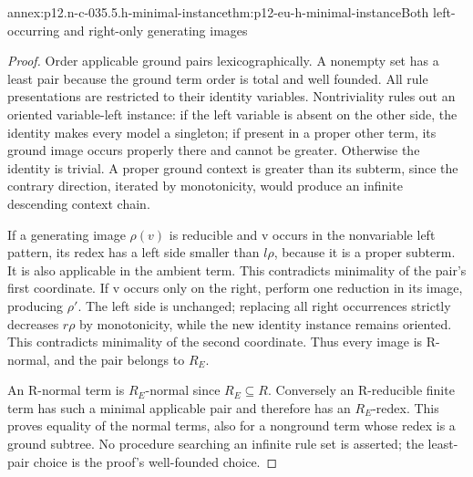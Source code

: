 \begin{annexitem}{annex:p12.n-c-035.5.h-minimal-instance}{thm:p12-eu-h-minimal-instance}{Both left-occurring and right-only generating images}
\begin{proof}
Order applicable ground pairs lexicographically. A nonempty set has
a least pair because the ground term order is total and well founded.
All rule presentations are restricted to their identity variables.
Nontriviality rules out an oriented variable-left instance: if the
left variable is absent on the other side, the identity makes every
model a singleton; if present in a proper other term, its ground
image occurs properly there and cannot be greater. Otherwise the
identity is trivial. A proper ground context is greater than its
subterm, since the contrary direction, iterated by monotonicity,
would produce an infinite descending context chain.

If a generating image \(\rho(v)\) is reducible and v occurs in
the nonvariable left pattern, its redex has a left side smaller
than \(l\rho\), because it is a proper subterm. It is also
applicable in the ambient term. This contradicts minimality of
the pair's first coordinate. If v occurs only on the right,
perform one reduction in its image, producing \(\rho'\).
The left side is unchanged; replacing all right occurrences
strictly decreases \(r\rho\) by monotonicity, while the new
identity instance remains oriented. This contradicts minimality
of the second coordinate. Thus every image is R-normal, and
the pair belongs to \(R_E\).

An R-normal term is \(R_E\)-normal since \(R_E\subseteq R\).
Conversely an R-reducible finite term has such a minimal applicable
pair and therefore has an \(R_E\)-redex. This proves equality
of the normal terms, also for a nonground term whose redex is a
ground subtree. No procedure searching an infinite rule set is
asserted; the least-pair choice is the proof's well-founded choice.
\end{proof}
\end{annexitem}

